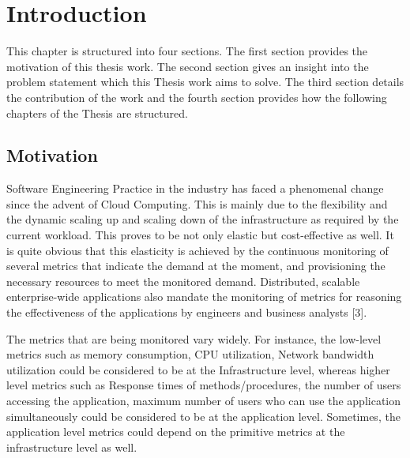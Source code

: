 \documentclass[article,type=msc,colorback,accentcolor=tud7b]{tudthesis}
\begin{document}
\listoffigures
\clearpage
\appendix
\cleardoublepage 

 \section{Introduction}
	
	\par This chapter is structured into four sections. The first section provides the motivation of this thesis work. The second section gives an insight into the problem statement which this Thesis work aims to solve. The third section details the contribution of the work and the fourth section provides how the following chapters of the Thesis are structured.
	
	\subsection{Motivation}
	
	Software Engineering Practice in the industry has faced a phenomenal change since the advent of Cloud Computing. This is mainly due to the flexibility and the dynamic scaling up and scaling down of the infrastructure as required by the current workload. This proves to be not only elastic but cost-effective as well. It is quite obvious that this elasticity is achieved by the continuous monitoring of several metrics that indicate the demand at the moment, and provisioning the necessary resources to meet the monitored demand. Distributed, scalable enterprise-wide applications also mandate the monitoring of metrics for reasoning the effectiveness of the applications by engineers and business analysts [3].
	
	\par The metrics that are being monitored vary widely. For instance, the low-level metrics such as memory consumption, CPU utilization, Network bandwidth utilization could be considered to be at the Infrastructure level, whereas higher level metrics such as Response times of methods/procedures, the number of users accessing the application, maximum number of users who can use the application simultaneously could be considered to be at the application level. Sometimes, the application level metrics could depend on the primitive metrics at the infrastructure level as well.
	
\end{document}
